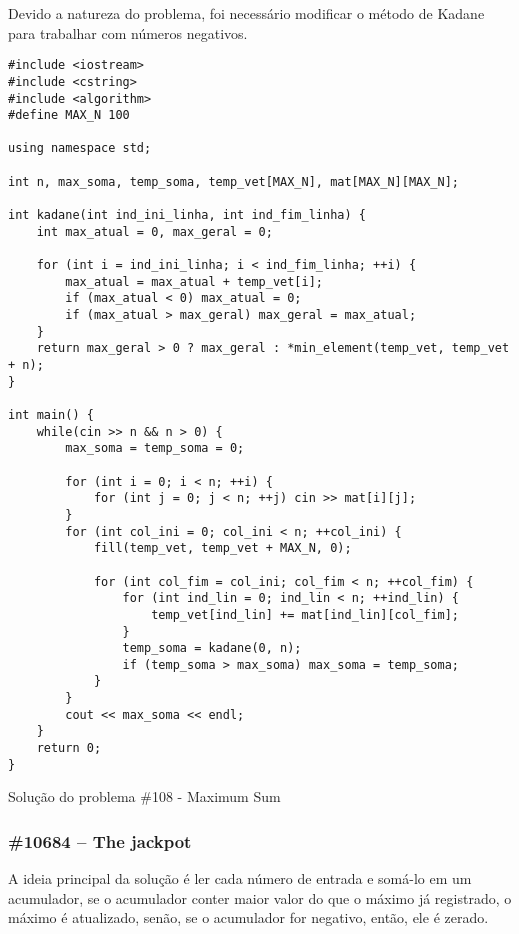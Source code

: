 \documentclass[a4paper,12pt]{scrartcl}
\begin{document}
Devido a natureza do problema, foi necessário modificar o método de Kadane para trabalhar com números negativos. 


\begin{listing}[H]
\begin{verbatim}
#include <iostream>
#include <cstring>
#include <algorithm>
#define MAX_N 100

using namespace std;

int n, max_soma, temp_soma, temp_vet[MAX_N], mat[MAX_N][MAX_N];

int kadane(int ind_ini_linha, int ind_fim_linha) {
    int max_atual = 0, max_geral = 0;

    for (int i = ind_ini_linha; i < ind_fim_linha; ++i) {
        max_atual = max_atual + temp_vet[i];
        if (max_atual < 0) max_atual = 0;
        if (max_atual > max_geral) max_geral = max_atual;
    }
    return max_geral > 0 ? max_geral : *min_element(temp_vet, temp_vet + n);
}

int main() {
    while(cin >> n && n > 0) {
        max_soma = temp_soma = 0;

        for (int i = 0; i < n; ++i) {
            for (int j = 0; j < n; ++j) cin >> mat[i][j];
        }
        for (int col_ini = 0; col_ini < n; ++col_ini) {
            fill(temp_vet, temp_vet + MAX_N, 0);

            for (int col_fim = col_ini; col_fim < n; ++col_fim) {
                for (int ind_lin = 0; ind_lin < n; ++ind_lin) {
                    temp_vet[ind_lin] += mat[ind_lin][col_fim];
                }
                temp_soma = kadane(0, n);
                if (temp_soma > max_soma) max_soma = temp_soma;
            }
        }
        cout << max_soma << endl;
    }
    return 0;
}
\end{verbatim}
\caption{\footnotesize{Solução do problema \#108 - Maximum Sum}}
\end{listing}

\subsubsection{\#10684 – The jackpot}
A ideia principal da solução é ler cada número de entrada e somá-lo em um acumulador, se o acumulador conter maior valor do que o máximo já registrado, o máximo é atualizado, senão, se o acumulador for negativo, então, ele é zerado.
\end{document}
